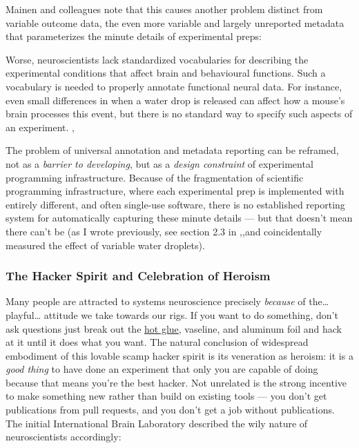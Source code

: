 \documentclass{article}
\begin{document}
Mainen and colleagues note that this causes another problem distinct
from variable outcome data, the even more variable and largely
unreported metadata that parameterizes the minute details of
experimental preps:

\begin{leftbar}
Worse, neuroscientists lack standardized vocabularies for describing the
experimental conditions that affect brain and behavioural functions.
Such a vocabulary is needed to properly annotate functional neural data.
For instance, even small differences in when a water drop is released
can affect how a mouse's brain processes this event, but there is no
standard way to specify such aspects of an experiment. \cite{mainenBetterWayCrack2016},\end{leftbar}
The problem of universal annotation and metadata reporting can be
reframed, not as a \emph{barrier to developing}, but as a \emph{design
constraint} of experimental programming infrastructure. Because of the
fragmentation of scientific programming infrastructure, where each
experimental prep is implemented with entirely different, and often
single-use software, there is no established reporting system for
automatically capturing these minute details --- but that doesn't mean
there can't be (as I wrote previously, see section 2.3 in \cite{saundersAutopilotAutomatingBehavioral2019},,and coincidentally
measured the effect of variable water droplets).

\hypertarget{the-hacker-spirit-and-celebration-of-heroism}{%
\subsubsection{The Hacker Spirit and Celebration of
Heroism}\label{the-hacker-spirit-and-celebration-of-heroism}}

Many people are attracted to systems neuroscience precisely
\emph{because} of the\ldots{} playful\ldots{} attitude we take towards
our rigs. If you want to do something, don't ask questions just break
out the \href{http://jvoigts.scripts.mit.edu/blog/review-hot-glue/}{hot
glue}, vaseline, and aluminum foil and hack at it until it does what you
want. The natural conclusion of widespread embodiment of this lovable
scamp hacker spirit is its veneration as heroism: it is a \emph{good
thing} to have done an experiment that only you are capable of doing
because that means you're the best hacker. Not unrelated is the strong
incentive to make something new rather than build on existing tools ---
you don't get publications from pull requests, and you don't get a job
without publications. The initial International Brain Laboratory
described the wily nature of neuroscientists accordingly:
\end{document}
